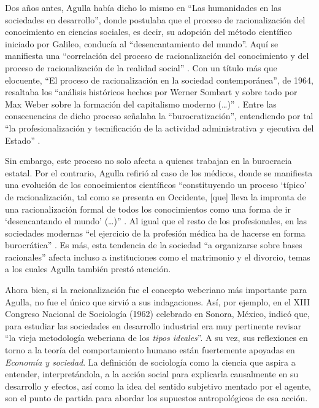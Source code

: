 Dos años antes, Agulla había dicho lo mismo en \enquote{Las humanidades en las sociedades en desarrollo}, donde postulaba que el proceso de racionalización del conocimiento en ciencias sociales, es decir, su adopción del método científico iniciado por Galileo, conducía al \enquote{desencantamiento del mundo}. Aquí se manifiesta una \enquote{correlación del proceso de racionalización del conocimiento y del proceso de racionalización de la realidad social} \parencite[pág.~67, énfasis en el original]{1641-AGULLA1965}. Con un título más que elocuente, \enquote{El proceso de racionalización en la sociedad contemporánea}, de 1964, resaltaba los \enquote{análisis históricos hechos por Werner Sombart y sobre todo por Max Weber sobre la formación del capitalismo moderno (\dots)} \parencite[16-17]{1641-AGULLA1965}. Entre las consecuencias de dicho proceso señalaba la \enquote{burocratización}, entendiendo por tal \enquote{la profesionalización y tecnificación de la actividad administrativa y ejecutiva del Estado} \parencite[20]{1641-AGULLA1965}.

Sin embargo, este proceso no solo afecta a quienes trabajan en la burocracia estatal. Por el contrario, Agulla refirió al caso de los médicos, donde se manifiesta una evolución de los conocimientos científicos \enquote{constituyendo un proceso \enquote{típico} de racionalización, tal como se presenta en Occidente, [que] lleva la impronta de una racionalización formal de todos los conocimientos como una forma de ir \enquote{desencantando el mundo} (\dots)} \parencite[27]{1641-AGULLA1965}. Al igual que el resto de los profesionales, en las sociedades modernas \enquote{el ejercicio de la profesión médica ha de hacerse en forma burocrática} \parencite[34]{1641-AGULLA1965}. Es más, esta tendencia de la sociedad \enquote{a organizarse sobre bases racionales} \parencite[42]{1641-AGULLA1965} afecta incluso a instituciones como el matrimonio y el divorcio, temas a los cuales Agulla también prestó atención.

Ahora bien, si la racionalización fue el concepto weberiano más importante para Agulla, no fue el único que sirvió a sus indagaciones. Así, por ejemplo, en el XIII Congreso Nacional de Sociología (1962) celebrado en Sonora, México, \textcite[85]{1641-AGULLA1965} indicó que, para estudiar las sociedades en desarrollo industrial era muy pertinente revisar \enquote{la vieja metodología weberiana de los \emph{tipos ideales}}. A su vez, sus reflexiones en torno a la teoría del comportamiento humano \parencite{1644-AGULLA1965,1645-AGULLA1966} están fuertemente apoyadas en \emph{Economía y sociedad}. La definición de sociología como la ciencia que aspira a entender, interpretándola, a la acción social para explicarla causalmente en su desarrollo y efectos, así como la idea del sentido subjetivo mentado por el agente, son el punto de partida para abordar los supuestos antropológicos de esa acción.

